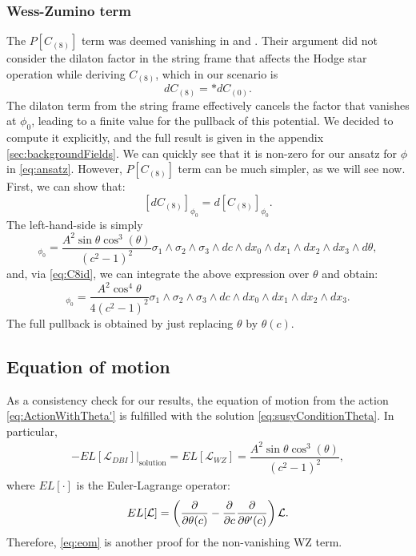\subsubsection{Wess-Zumino term}
The $P[C_{(8)}]$ term was deemed vanishing in \cite{Albash:2011nw} and \cite{Evans:2005ti}. Their argument did not consider the dilaton factor in the string frame that affects the Hodge star operation while deriving $C_{(8)}$, which in our scenario is
\begin{equation}
 dC_{(8)} = \ast dC_{(0)}.
\end{equation}
The dilaton term from the string frame effectively cancels the factor that vanishes at $\phi_0$, leading to a finite value for the pullback of this potential. We decided to compute it explicitly, and the full result is given in the appendix \ref{sec:backgroundFields}. We can quickly see that it is non-zero for our ansatz for $\phi$ in \eqref{eq:ansatz}. However, $P[C_{(8)}]$ term can be much simpler, as we will see now. First, we can show that:
\begin{equation}\label{eq:C8id}
 [d C_{(8)}]_{\phi_0} = d [C_{(8)}]_{\phi_0}.
\end{equation}
The left-hand-side is simply
\begin{equation}
 [d C_{(8)}]_{\phi_0}  = \dfrac{A^2 \sin\theta \cos^3(\theta)}{\left(c^2-1\right)^2} 
\sigma_1 \wedge \sigma_2 \wedge \sigma_3 \wedge dc  \wedge dx_0 \wedge dx_1 \wedge dx_2 \wedge dx_3 \wedge d\theta,
\end{equation}
and, via \eqref{eq:C8id}, we can integrate the above expression over $\theta$ and obtain:
\begin{equation}
[C_{(8)}]_{\phi_0} = \dfrac{A^2 \cos^4\theta}{4 \left(c^2-1\right)^2} \sigma_1 \wedge \sigma_2 \wedge \sigma_3 \wedge dc \wedge dx_0 \wedge dx_1 \wedge dx_2 \wedge dx_3.
\end{equation}
The full pullback is obtained by just replacing $\theta$ by $\theta(c)$.





\subsection{Equation of motion}

As a consistency check for our results, the equation of motion from the action \eqref{eq:ActionWithTheta'} is fulfilled with the solution \eqref{eq:susyConditionTheta}. In particular, 
\begin{align}\label{eq:eom}
-\left.EL[\mathcal{L}_{DBI}]\right|_\text{solution} = EL[\mathcal{L}_{WZ}] = \dfrac{A^2 \sin\theta \cos^3(\theta)}{\left(c^2-1\right)^2},
\end{align}
where $EL[\cdot]$ is the Euler-Lagrange operator:
\begin{equation}
 EL[\mathcal{L}] = 
 \left(\dfrac{\partial }{\partial \theta(c)} -\dfrac{\partial }{\partial c}  \dfrac{\partial }{\partial \theta'(c)} \right) \mathcal{L}.
\end{equation}
Therefore, \eqref{eq:eom} is another proof for the non-vanishing WZ term.



